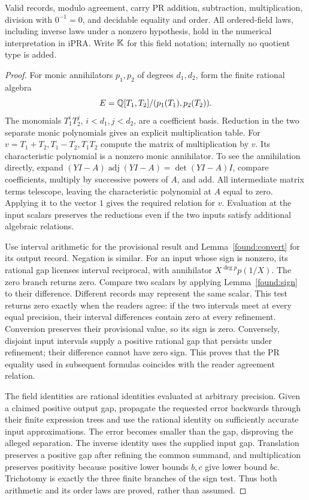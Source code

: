 \begin{theorem}\label{found:field}
Valid records, modulo agreement, carry PR addition, subtraction,
multiplication, division with $0^{-1}=0$, and decidable equality and order.
All ordered-field laws, including inverse laws under a nonzero hypothesis,
hold in the numerical interpretation in iPRA. Write $\mathbb K$ for this field
notation; internally no quotient type is added.
\end{theorem}
\begin{proof}
For monic annihilators $p_1,p_2$ of degrees $d_1,d_2$, form the finite
rational algebra
\[
 E=\mathbb Q[T_1,T_2]/(p_1(T_1),p_2(T_2)).
\]
The monomials $T_1^iT_2^j$, $i<d_1,j<d_2$, are a coefficient basis.
Reduction in the two separate monic polynomials gives an explicit
multiplication table. For $v=T_1+T_2,T_1-T_2,T_1T_2$ compute the matrix
of multiplication by $v$. Its characteristic polynomial is a nonzero
monic annihilator. To see the annihilation directly, expand
$(YI-A)\operatorname{adj}(YI-A)=\det(YI-A)I$, compare coefficients,
multiply by successive powers of $A$, and add. All intermediate matrix
terms telescope, leaving the characteristic polynomial at $A$ equal to
zero. Applying it to the vector $1$ gives the required relation for $v$.
Evaluation at the input scalars preserves the reductions even if the
two inputs satisfy additional algebraic relations.

Use interval arithmetic for the provisional result and
Lemma~\ref{found:convert} for its output record. Negation is similar.
For an input whose sign is nonzero, its rational gap licenses interval
reciprocal, with annihilator $X^{\deg p}p(1/X)$. The zero branch returns
zero. Compare two scalars by applying Lemma~\ref{found:sign} to their
difference. Different records may represent the same scalar.
This test returns zero exactly when the readers agree: if the two
intervals meet at every equal precision, their interval differences contain
zero at every refinement. Conversion preserves their provisional value,
so its sign is zero. Conversely, disjoint input intervals supply a positive
rational gap that persists under refinement; their difference cannot have
zero sign. This proves that the PR equality used in subsequent formulas
coincides with the reader agreement relation.

The field identities are rational identities evaluated at arbitrary
precision. Given a claimed positive output gap, propagate the requested
error backwards through their finite expression trees and use the rational
identity on sufficiently accurate input approximations. The error becomes
smaller than the gap, disproving the alleged separation. The inverse
identity uses the supplied input gap. Translation preserves a positive
gap after refining the common summand, and multiplication preserves
positivity because positive lower bounds $b,c$ give lower bound $bc$.
Trichotomy is exactly the three finite branches of the sign test.
Thus both arithmetic and its order laws are proved, rather than assumed.
\end{proof}

